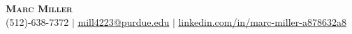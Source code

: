 \documentclass[letterpaper,11pt]{article}
\begin{document}

\begin{center}
    \textbf{\Huge \scshape Marc Miller} \\ \vspace{2pt}
    \small (512)-638-7372 $|$ \href{mailto:mill4223@purdue.edu}{\underline{mill4223@purdue.edu}} $|$ 
    \href{linkedin.com/in/marc-miller-a878632a8}{\underline{linkedin.com/in/marc-miller-a878632a8}} %
\end{center}





\end{document}
